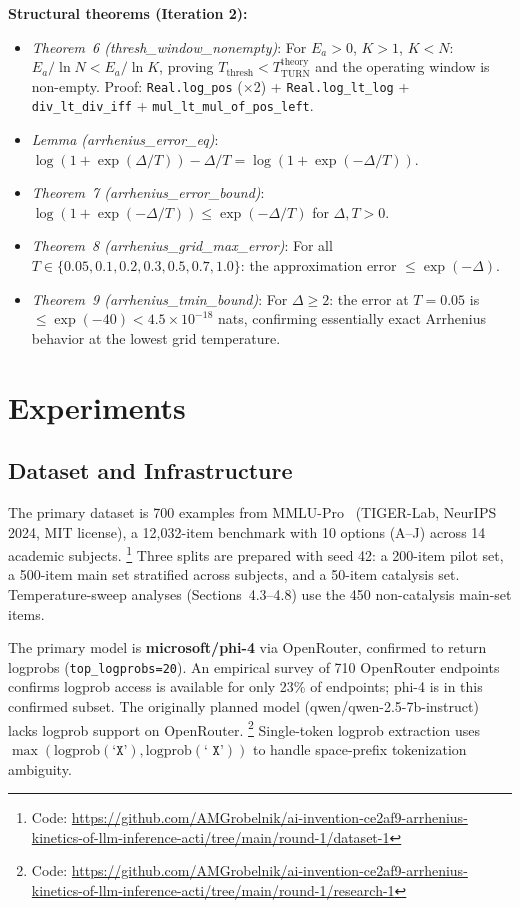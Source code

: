 \documentclass[11pt,letterpaper,twocolumn]{article}
\begin{document}
\textbf{Structural theorems (Iteration 2):}
\begin{itemize}[leftmargin=*,topsep=2pt,itemsep=2pt]
  \item \emph{Theorem~6 (thresh\_window\_nonempty)}: For $E_a > 0$, $K > 1$, $K < N$:
  $E_a/\ln N < E_a/\ln K$, proving $T_\text{thresh} < T_\text{TURN}^\text{theory}$ and
  the operating window is non-empty. Proof: \texttt{Real.log\_pos} ($\times$2) +
  \texttt{Real.log\_lt\_log} + \texttt{div\_lt\_div\_iff} +
  \texttt{mul\_lt\_mul\_of\_pos\_left}.
  \item \emph{Lemma (arrhenius\_error\_eq)}: $\log(1+\exp(\Delta/T)) - \Delta/T =
  \log(1+\exp(-\Delta/T))$.
  \item \emph{Theorem~7 (arrhenius\_error\_bound)}: $\log(1+\exp(-\Delta/T)) \leq
  \exp(-\Delta/T)$ for $\Delta, T > 0$.
  \item \emph{Theorem~8 (arrhenius\_grid\_max\_error)}: For all $T \in \{0.05, 0.1, 0.2,
  0.3, 0.5, 0.7, 1.0\}$: the approximation error $\leq \exp(-\Delta)$.
  \item \emph{Theorem~9 (arrhenius\_tmin\_bound)}: For $\Delta \geq 2$: the error at
  $T = 0.05$ is $\leq \exp(-40) < 4.5 \times 10^{-18}$ nats, confirming essentially
  exact Arrhenius behavior at the lowest grid temperature.
\end{itemize}

\section{Experiments}

\subsection{Dataset and Infrastructure}

The primary dataset is 700 examples from MMLU-Pro~\cite{Wang2024} (TIGER-Lab, NeurIPS
2024, MIT license), a 12,032-item benchmark with 10 options (A--J) across 14 academic
subjects.%
\footnote{Code: \url{https://github.com/AMGrobelnik/ai-invention-ce2af9-arrhenius-kinetics-of-llm-inference-acti/tree/main/round-1/dataset-1}}
Three splits are prepared with seed 42: a 200-item pilot set, a 500-item main set
stratified across subjects, and a 50-item catalysis set. Temperature-sweep analyses
(Sections~4.3--4.8) use the 450 non-catalysis main-set items.

The primary model is \textbf{microsoft/phi-4} via OpenRouter, confirmed to return logprobs
(\texttt{top\_logprobs=20}). An empirical survey of 710 OpenRouter endpoints~\cite{Chauvin2025}
confirms logprob access is available for only 23\% of endpoints; phi-4 is in this confirmed
subset. The originally planned model (qwen/qwen-2.5-7b-instruct) lacks logprob support on
OpenRouter.%
\footnote{Code: \url{https://github.com/AMGrobelnik/ai-invention-ce2af9-arrhenius-kinetics-of-llm-inference-acti/tree/main/round-1/research-1}}
Single-token logprob extraction uses $\max(\text{logprob}(\texttt{`X'}),
\text{logprob}(\texttt{` X'}))$ to handle space-prefix tokenization ambiguity.
\end{document}
